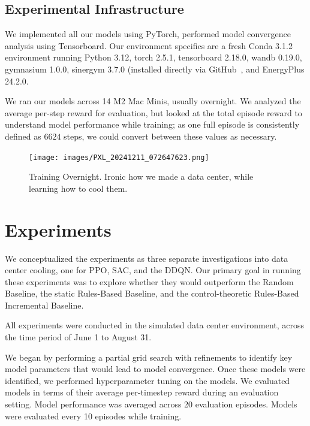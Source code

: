 \documentclass[12pt]{article}
\begin{document}
\subsection{Experimental Infrastructure}\label{method:practical}

We implemented all our models using PyTorch, performed model convergence analysis using Tensorboard. Our environment specifics are a fresh Conda 3.1.2 environment running Python 3.12, torch 2.5.1, tensorboard 2.18.0, wandb 0.19.0, gymnasium 1.0.0, sinergym 3.7.0 (installed directly via GitHub~\cite{sinergym_github}, and EnergyPlus 24.2.0.

We ran our models across 14 M2 Mac Minis, usually overnight. We analyzed the average per-step reward for evaluation, but looked at the total episode reward to understand model performance while training; as one full episode is consistently defined as $6624$ steps, we could convert between these values as necessary. 

\begin{figure}[h!]
    \centering
    \texttt{[image: images/PXL\_20241211\_072647623.png]}
    \caption{Training Overnight. Ironic how we made a data center, while learning how to cool them.}
    \label{fig:training_overnight}
\end{figure}


\section{Experiments}

We conceptualized the experiments as three separate investigations into data center cooling, one for PPO, SAC, and the DDQN. Our primary goal in running these experiments was to explore whether they would outperform the Random Baseline, the static Rules-Based Baseline, and the control-theoretic Rules-Based Incremental Baseline. 

All experiments were conducted in the simulated data center environment, across the time period of June 1 to August 31. 

We began by performing a partial grid search with refinements to identify key model parameters that would lead to model convergence. Once these models were identified, we performed hyperparameter tuning on the models. We evaluated models in terms of their average per-timestep reward during an evaluation setting. Model performance was averaged across 20 evaluation episodes.  Models were evaluated every 10 episodes while training. 
\end{document}
